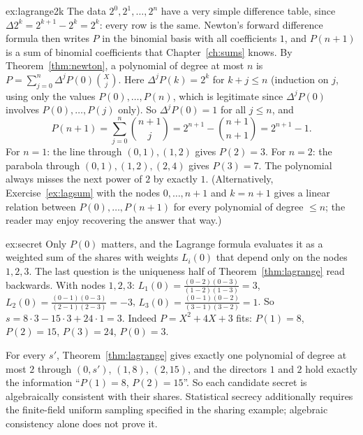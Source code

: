 \begin{solution}{ex:lagrange2k}
\idea The data $2^0,2^1,\dots,2^n$ have a very simple difference table, since $\Delta2^k=2^{k+1}-2^k=2^k$: every row is the same. Newton's forward difference formula then writes $P$ in the binomial basis with all coefficients $1$, and $P(n+1)$ is a sum of binomial coefficients that Chapter~\ref{ch:sums} knows.
\writeup By Theorem~\ref{thm:newton}, a polynomial of degree at most $n$ is $P=\sum_{j=0}^n\Delta^jP(0)\binom Xj$. Here $\Delta^jP(k)=2^k$ for $k+j\le n$ (induction on $j$, using only the values $P(0),\dots,P(n)$, which is legitimate since $\Delta^jP(0)$ involves $P(0),\dots,P(j)$ only). So $\Delta^jP(0)=1$ for all $j\le n$, and
\[
P(n+1)=\sum_{j=0}^n\binom{n+1}j=2^{n+1}-\binom{n+1}{n+1}=2^{n+1}-1.
\]
For $n=1$: the line through $(0,1),(1,2)$ gives $P(2)=3$. For $n=2$: the parabola through $(0,1),(1,2),(2,4)$ gives $P(3)=7$. The polynomial always misses the next power of $2$ by exactly $1$. (Alternatively, Exercise~\ref{ex:lagsum} with the nodes $0,\dots,n+1$ and $k=n+1$ gives a linear relation between $P(0),\dots,P(n+1)$ for every polynomial of degree $\le n$; the reader may enjoy recovering the answer that way.)
\end{solution}

\begin{solution}{ex:secret}
\idea Only $P(0)$ matters, and the Lagrange formula evaluates it as a weighted sum of the shares with weights $L_i(0)$ that depend only on the nodes $1,2,3$. The last question is the uniqueness half of Theorem~\ref{thm:lagrange} read backwards.
\writeup With nodes $1,2,3$:
$L_1(0)=\frac{(0-2)(0-3)}{(1-2)(1-3)}=3$, $L_2(0)=\frac{(0-1)(0-3)}{(2-1)(2-3)}=-3$, $L_3(0)=\frac{(0-1)(0-2)}{(3-1)(3-2)}=1$. So
$s=8\cdot3-15\cdot3+24\cdot1=3$. Indeed $P=X^2+4X+3$ fits: $P(1)=8$, $P(2)=15$, $P(3)=24$, $P(0)=3$.

For every $s'$, Theorem~\ref{thm:lagrange} gives exactly one polynomial of degree at most $2$ through $(0,s')$, $(1,8)$, $(2,15)$, and the
directors $1$ and $2$ hold exactly the information ``$P(1)=8$, $P(2)=15$''. So each candidate secret is algebraically consistent with their shares. Statistical secrecy additionally requires the finite-field uniform sampling specified in the sharing example; algebraic consistency alone does not prove it.
\end{solution}

